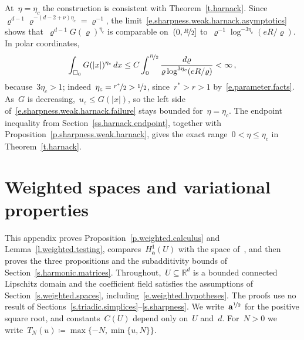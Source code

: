 \documentclass[11pt,letterpaper]{article}
\numberwithin{equation}{section}
\theoremstyle{definition}
\newcommand{\Rd}{\mathbb{R}^d}
\renewcommand{\a}{\mathbf{a}}
\newcommand{\eps}{\varepsilon}
\newcommand{\nf}{\nicefrac}
\newcommand{\cu}{\square}
\begin{document}
\smallskip
At~$\eta=\eta_c$ the construction is consistent with Theorem~\ref{t.harnack}. Since~$\varrho^{d-1}\varrho^{-(d-2+\nu)\eta_c}=\varrho^{-1}$, the limit~\eqref{e.sharpness.weak.harnack.asymptotics} shows that~$\varrho^{d-1}G(\varrho)^{\eta_c}$ is comparable on~$(0,\nf R2]$ to~$\varrho^{-1}\log^{-3\eta_c}(eR/\varrho)$. In polar coordinates,
\begin{equation*}
	\int_{\cu_0}G(|x|)^{\eta_c}\,dx\leq C\int_0^{\nf R2}\frac{d\varrho}{\varrho\log^{3\eta_c}(eR/\varrho)}<\infty\,,
\end{equation*}
because~$3\eta_c>1$; indeed~$\eta_c=\nf{r^*}2>\nf12$, since~$r^*>r>1$ by~\eqref{e.parameter.facts}. As~$G$ is decreasing,~$u_\eps\leq G(|x|)$, so the left side of~\eqref{e.sharpness.weak.harnack.failure} stays bounded for~$\eta=\eta_c$. The endpoint inequality from Section~\ref{ss.harnack.endpoint}, together with Proposition~\ref{p.sharpness.weak.harnack}, gives the exact range~$0<\eta\leq\eta_c$ in Theorem~\ref{t.harnack}.

\appendix

\section{Weighted spaces and variational properties}
\label{a.weighted.proofs}

This appendix proves Proposition~\ref{p.weighted.calculus} and Lemma~\ref{l.weighted.testing}, compares~$H^1_\a(U)$ with the space of~\cite{AK.HC}, and then proves the three propositions and the subadditivity bounds of Section~\ref{s.harmonic.matrices}. Throughout,~$U\subseteq\Rd$ is a bounded connected Lipschitz domain and the coefficient field satisfies the assumptions of Section~\ref{s.weighted.spaces}, including~\eqref{e.weighted.hypotheses}. The proofs use no result of Sections~\ref{s.triadic.simplices}--\ref{s.sharpness}. We write~$\a^{\nf12}$ for the positive square root, and constants~$C(U)$ depend only on~$U$ and~$d$. For~$N>0$ we write~$T_N(u)\coloneqq\max\{-N,\min\{u,N\}\}$.
\end{document}
